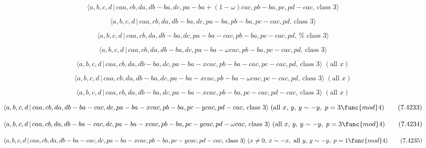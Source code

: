\documentclass[10pt]{article}
\begin{document}
\begin{equation}
\langle a,b,c,d\,|\,caa,cb,da,db-ba,dc,pa-ba+(1-\omega
)cac,pb-ba,pc,pd-cac,\,\text{class }3\rangle  \tag{7.4226}
\end{equation}

\begin{equation}
\langle a,b,c,d\,|\,caa,cb,da,db-ba,dc,pa-ba,pb-ba,pc-cac,pd,\,\text{class }%
3\rangle  \tag{7.4227}
\end{equation}

\begin{equation}
\langle a,b,c,d\,|\,caa,cb,da,db-ba,dc,pa-ba-cac,pb-ba,pc-cac,pd,\,\text{%
class }3\rangle  \tag{7.4228}
\end{equation}

\begin{equation}
\langle a,b,c,d\,|\,caa,cb,da,db-ba,dc,pa-ba-\omega cac,pb-ba,pc-cac,pd,\,%
\text{class }3\rangle  \tag{7.4229}
\end{equation}

\begin{equation}
\langle a,b,c,d\,|\,caa,cb,da,db-ba,dc,pa-ba-xcac,pb-ba-cac,pc-cac,pd,\,%
\text{class }3\rangle \;(\text{all }x)  \tag{7.4230}
\end{equation}

\begin{equation}
\langle a,b,c,d\,|\,caa,cb,da,db-ba,dc,pa-ba-xcac,pb-ba-\omega
cac,pc-cac,pd,\,\text{class }3\rangle \;(\text{all }x)  \tag{7.4231}
\end{equation}

\begin{equation}
\langle a,b,c,d\,|\,caa,cb,da,db-ba,dc,pa-ba-xcac,pb-ba,pc-cac,pd-cac,\,%
\text{class }3\rangle \;(\text{all }x)  \tag{7.4232}
\end{equation}

\begin{equation}
\langle a,b,c,d\,|\,caa,cb,da,db-ba-cac,dc,pa-ba-xcac,pb-ba,pc-ycac,pd-cac,\,%
\text{class }3\rangle \;(\text{all }x,\,y,\,y\sim -y,\;p=3\func{mod}4) 
\tag{7.4233}
\end{equation}

\begin{equation}
\langle
a,b,c,d\,|\,caa,cb,da,db-ba-cac,dc,pa-ba-xcac,pb-ba,pc-ycac,pd-\omega cac,\,%
\text{class }3\rangle \;(\text{all }x,\,y,\,y\sim -y,\;p=3\func{mod}4) 
\tag{7.4234}
\end{equation}

\begin{equation}
\langle a,b,c,d\,|\,caa,cb,da,db-ba-cac,dc,pa-ba-xcac,pb-ba,pc-ycac,pd-cac,\,%
\text{class }3\rangle \;(x\neq 0,\,x\sim -x,\text{ all }y,\,y\sim -y,\;p=1%
\func{mod}4)  \tag{7.4235}
\end{equation}
\end{document}
